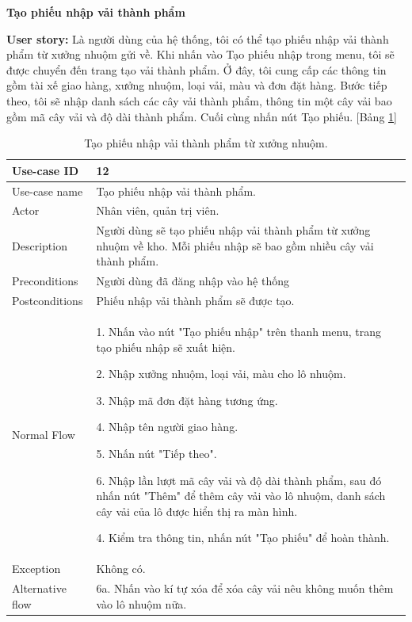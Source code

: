 \textbf{Tạo phiếu nhập vải thành phẩm}\par
\textbf{User story:} Là người dùng của hệ thống, tôi có thể tạo phiếu nhập vải thành phẩm từ xưởng nhuộm gửi về. Khi nhấn vào Tạo phiếu nhập trong menu, tôi sẽ được chuyển đến trang tạo vải thành phẩm. Ở đây, tôi cung cấp các thông tin gồm tài xế giao hàng, xưởng nhuộm, loại vải, màu và đơn đặt hàng. Bước tiếp theo, tôi sẽ nhập danh sách các cây vải thành phẩm, thông tin một cây vải bao gồm mã cây vải và độ dài thành phẩm. Cuối cùng nhấn nút Tạo phiếu. [Bảng \ref{bang11}]
\begin{table}[H]
    \centering
    \begin{tabular}{|m{3cm}|m{10cm}|}
    \hline 
        Use-case ID & 12\\ \hline
        Use-case name & Tạo phiếu nhập vải thành phẩm.\\ \hline
        Actor & Nhân viên, quản trị viên.\\ \hline
        Description & Người dùng sẽ tạo phiếu nhập vải thành phẩm từ xưởng nhuộm về kho. Mỗi phiếu nhập sẽ bao gồm nhiều cây vải thành phẩm.\\ \hline
        Preconditions & Người dùng đã đăng nhập vào hệ thống \\ \hline
        Postconditions & Phiếu nhập vải thành phẩm sẽ được tạo.\\ \hline
        Normal Flow & 
        1. Nhấn vào nút "Tạo phiếu nhập" trên thanh menu, trang tạo phiếu nhập sẽ xuất hiện.\par
        2. Nhập xưởng nhuộm, loại vải, màu cho lô nhuộm.\par
        3. Nhập mã đơn đặt hàng tương ứng.\par
        4. Nhập tên người giao hàng.\par
        5. Nhấn nút "Tiếp theo".\par
        6. Nhập lần lượt mã cây vải và độ dài thành phẩm, sau đó nhấn nút "Thêm" để thêm cây vải vào lô nhuộm, danh sách cây vải của lô được hiển thị ra màn hình.\par
        4. Kiểm tra thông tin, nhấn nút "Tạo phiếu" để hoàn thành.
        \\ \hline
        Exception & Không có.
        \\ \hline
        Alternative flow & 
        6a. Nhấn vào kí tự xóa để xóa cây vải nêu không muốn thêm vào lô nhuộm nữa.
        \\ 
    \hline 
    \end{tabular}
    \caption{Tạo phiếu nhập vải thành phẩm từ xưởng nhuộm.}
    \label{bang11}
\end{table}


